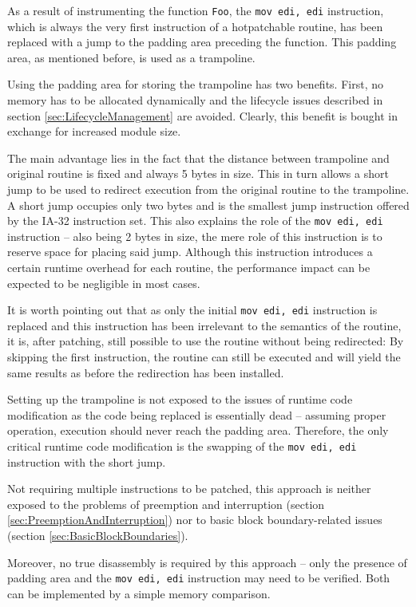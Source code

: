 As a result of instrumenting the function \verb|Foo|, the \verb|mov edi, edi| instruction,
which is always the very first instruction of a hotpatchable routine, has been 
replaced with a jump to the padding area preceding the function. This padding area, 
as mentioned before, is used as a trampoline.

Using the padding area for storing the trampoline has two benefits. 
First, no memory has to be allocated dynamically and the lifecycle issues
described in section \ref{sec:LifecycleManagement} are avoided. Clearly, 
this benefit is bought in exchange for increased module size. 

The main advantage lies in the fact that the distance between trampoline 
and original routine is fixed and always 5 bytes in size. This in turn
allows a short jump to be used to redirect execution from the original 
routine to the trampoline. A short jump occupies only two bytes and is
the smallest jump instruction offered by the IA-32 instruction set. This
also explains the role of the \verb|mov edi, edi| instruction -- also being 
2 bytes in size, the mere role of this instruction is to reserve space for 
placing said jump. Although this instruction introduces a certain
runtime overhead for each routine, the performance impact can be expected
to be negligible in most cases.

It is worth pointing out that as only the initial \verb|mov edi, edi| instruction 
is replaced and this instruction has been irrelevant to the semantics of the routine, 
it is, after patching, still possible to use the routine without being redirected: 
By skipping the first instruction, the routine can still be executed and will 
yield the same results as before the redirection has been installed. 

Setting up the trampoline is not exposed to the issues of runtime code 
modification as the code being replaced is essentially dead -- assuming proper
operation, execution should never reach the padding area. Therefore, the only
critical runtime code modification is the swapping of the \verb|mov edi, edi|
instruction with the short jump.

Not requiring multiple instructions to be patched, this approach is neither exposed
to the problems of preemption and interruption (section \ref{sec:PreemptionAndInterruption})
nor to basic block boundary-related issues (section \ref{sec:BasicBlockBoundaries}).

Moreover, no true disassembly is required by this approach -- only the presence
of padding area and the \verb|mov edi, edi| instruction may need to be verified. 
Both can be implemented by a simple memory comparison.

